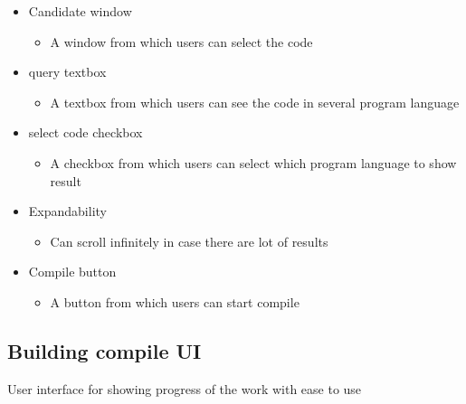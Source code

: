 \documentclass[conference]{IEEEtran}
\begin{document}
\begin{itemize}
  \item Candidate window
  \begin{itemize}
    \item A window from which users can select the code 
  \end{itemize}
  \item query textbox
  \begin{itemize}
    \item A textbox from which users can see the code in several program language
  \end{itemize}
  \item select code checkbox
  \begin{itemize}
    \item A checkbox from which users can select which program language to show result
  \end{itemize}
  \item Expandability 
  \begin{itemize}
    \item Can scroll infinitely in case there are lot of results
  \end{itemize}
  \item Compile button 
  \begin{itemize}
    \item A button from which users can start compile
  \end{itemize}
\end{itemize}
\textit{ }


\subsection{Building compile UI}
 User interface for showing progress of the work with ease to use
\end{document}
